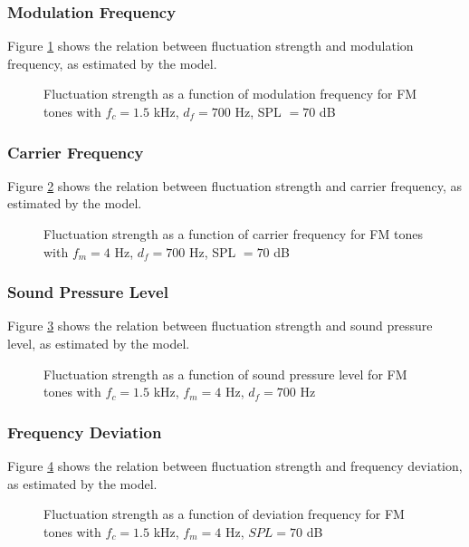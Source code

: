 \documentclass[a4paper]{article}
\begin{document}
\subsubsection{Modulation Frequency}

Figure \ref{fig:FMtonesfmplot} shows the relation between fluctuation strength
and modulation frequency, as estimated by the model.

\begin{figure}[ht]
    \centering
    \resizebox{!}{8cm}{
        
    }
    \caption{Fluctuation strength as a function of modulation frequency for FM
        tones with $f_c = 1.5$ kHz, $d_f = 700$ Hz, SPL $= 70$ dB}
    \label{fig:FMtonesfmplot}
\end{figure}

\subsubsection{Carrier Frequency}

Figure \ref{fig:FMtonesfcplot} shows the relation between fluctuation strength
and carrier frequency, as estimated by the model.

\begin{figure}[ht]
    \centering
    \resizebox{!}{8cm}{
        
    }
    \caption{Fluctuation strength as a function of carrier frequency for FM
        tones with $f_m = 4$ Hz, $d_f = 700$ Hz, SPL $= 70$ dB}
    \label{fig:FMtonesfcplot}
\end{figure}

\subsubsection{Sound Pressure Level}

Figure \ref{fig:FMtonesSPLplot} shows the relation between fluctuation strength
and sound pressure level, as estimated by the model.

\begin{figure}[ht]
    \centering
    \resizebox{!}{8cm}{
        
    }
    \caption{Fluctuation strength as a function of sound pressure level for FM
        tones with $f_c = 1.5$ kHz, $f_m = 4$ Hz, $d_f = 700$ Hz}
    \label{fig:FMtonesSPLplot}
\end{figure}

\subsubsection{Frequency Deviation}

Figure \ref{fig:FMtonesdfplot} shows the relation between fluctuation strength
and frequency deviation, as estimated by the model.

\begin{figure}[ht]
    \centering
    \resizebox{!}{8cm}{
        
    }
    \caption{Fluctuation strength as a function of deviation frequency for FM
        tones with $f_c = 1.5$ kHz, $f_m = 4$ Hz, $SPL = 70$ dB}
    \label{fig:FMtonesdfplot}
\end{figure}
\end{document}

